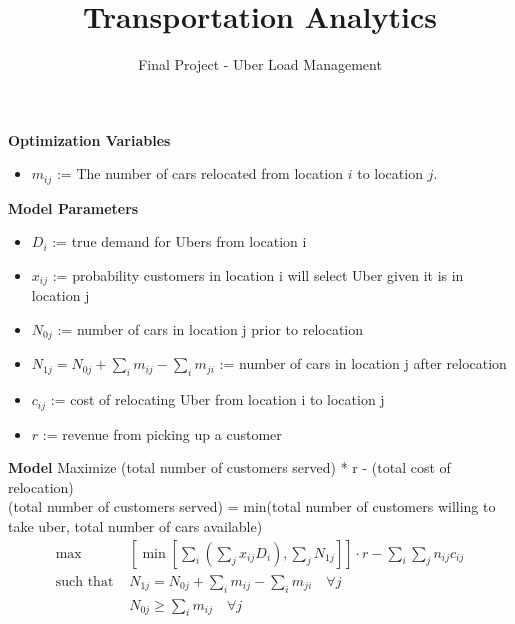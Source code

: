 \documentclass[12pt]{article}
\begin{document}
 
 
\title{Transportation Analytics}
\author{Final Project - Uber Load Management}

\maketitle

\textbf{Optimization Variables}

\begin{itemize}
\item $m_{ij}$ := The number of cars relocated from location $i$ to location $j$.
\end{itemize}

\vspace{.3 in}

\textbf{Model Parameters}
\begin{itemize}
\item $D_i$ := true demand for Ubers from location i
\item $x_{ij}$ := probability customers in location i will select Uber given it is in location j
\item $N_{0j}$ := number of cars in location j prior to relocation
\item $N_{1j} = N_{0j} + \sum_im_{ij} - \sum_im_{ji}$ := number of cars in location j after relocation
\item $c_{ij}$ := cost of relocating Uber from location i to location j
\item $r$ := revenue from picking up a customer
\end{itemize}

\vspace{.3 in}

\textbf{Model}
Maximize (total number of customers served) * r - (total cost of relocation)\\
(total number of customers served)  = min(total number of customers willing to take uber, total number of cars available)
\begin{align*}
\max & \left[\min\left[\sum_i \left(\sum_j x_{ij}D_i\right),\sum_j N_{1j} \right]\right]\cdot r - \sum_i\sum_jn_{ij}c_{ij} \\
\text{such that      } & N_{1j} = N_{0j} + \sum_i m_{ij} - \sum_i m_{ji} \quad \forall j\\
& N_{0j}\geq \sum_i m_{ij} \quad \forall j
\end{align*}
\end{document}
